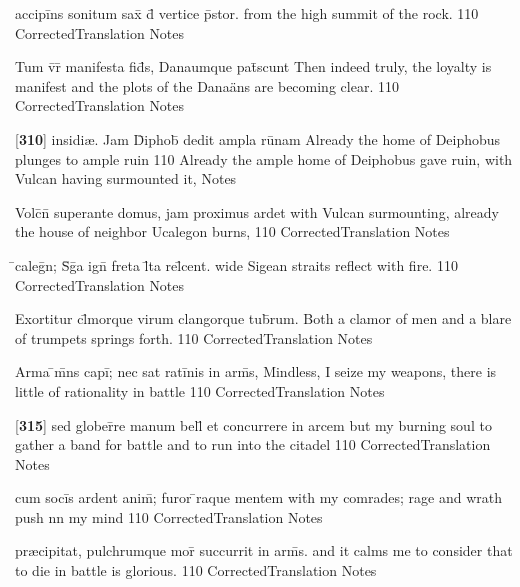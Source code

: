 \latline
  {accipi\={}ns sonitum sax\={\macron {\i}} d\={} vertice p\={}stor.}
  { from the high summit of the rock. }
  {110}
  { CorrectedTranslation }
  { Notes }


\latline
  {Tum v\={}r\={} manifesta fid\={}s, Danaumque pat\={}scunt}
  { Then indeed truly, the loyalty is manifest and the plots of the Dana\"ans are becoming clear. }
  {110}
  { CorrectedTranslation }
  { Notes }


\latline
  {[\textbf{310}] insidi{\ae}.  Jam D\={}iphob\={\macron {\i}} dedit ampla ru\={\macron {\i}}nam}
  { Already the home of Deiphobus plunges to ample ruin  }
  {110}
  { Already the ample home of Deiphobus gave ruin, with Vulcan having surmounted it, }
  { Notes }


\latline
  {Volc\={}n\={} superante domus, jam proximus ardet}
  { with Vulcan surmounting, already the house of neighbor Ucalegon burns, }
  {110}
  { CorrectedTranslation }
  { Notes }


\latline
  {\={}caleg\={}n; S\={\macron {\i}}g\={}a ign\={\macron {\i}} freta l\={}ta rel\={}cent.}
  { wide Sigean straits reflect with fire. }
  {110}
  { CorrectedTranslation }
  { Notes }


\latline
  {Exortitur cl\={}morque virum clangorque tub\={}rum.}
  { Both a clamor of men and a blare of trumpets springs forth. }
  {110}
  { CorrectedTranslation }
  { Notes }


\latline
  {Arma \={}m\={}ns capi\={}; nec sat rati\={}nis in arm\={\macron {\i}}s,}
  { Mindless, I seize my weapons, there is little of rationality in battle }
  {110}
  { CorrectedTranslation }
  { Notes }


\latline
  {[\textbf{315}] sed glober\={}re manum bell\={} et concurrere in arcem }
  { but my burning soul to gather a band for battle and to run into the citadel }
  {110}
  { CorrectedTranslation }
  { Notes }


\latline
  {cum soci\={\macron {\i}}s ardent anim\={\macron {\i}}; furor \={\macron {\i}}raque mentem}
  { with my comrades; rage and wrath push nn my mind }
  {110}
  { CorrectedTranslation }
  { Notes }


\latline
  {pr{\ae}cipitat, pulchrumque mor\={\macron {\i}} succurrit in arm\={\macron {\i}}s.}
  { and it calms me to consider that to die in battle is glorious. }
  {110}
  { CorrectedTranslation }
  { Notes }


